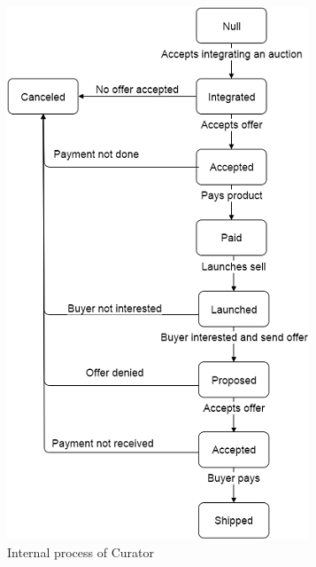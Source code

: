 \documentclass[a4paper,11pt]{report}
\begin{document}
   \begin{figure}[ht!]
    \centering
    \includegraphics[width=\textwidth]{media/statechart_curator.png}
    \caption{Internal process of Curator}
    \label{figure:statechartCurator}
   \end{figure}
\end{document}
